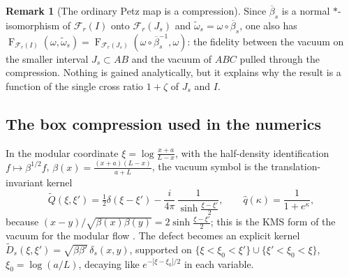 \documentclass[11pt]{article}
\theoremstyle{accent}
\theoremstyle{definition}
\newtheorem{remark}[theorem]{Remark}
\newcommand{\cF}{\mathcal{F}}
\newcommand{\Fid}{\operatorname{F}}
\begin{document}
\begin{remark}[The ordinary Petz map is a compression]
Since \(\overline\beta_s\) is a normal \(*\)-isomorphism of \(\cF_r(I)\) onto \(\cF_r(J_s)\) and \(\widetilde\omega_s=\omega\circ\overline\beta_s\), one also has
\(\Fid_{\cF_r(I)}(\omega,\widetilde\omega_s)=\Fid_{\cF_r(J_s)}(\omega\circ\overline\beta_s^{-1},\omega)\): the fidelity between the vacuum on the smaller interval \(J_s\subset AB\) and the vacuum of \(ABC\) pulled through the compression.  Nothing is gained analytically, but it explains why the result is a function of the single cross ratio \(1+\zeta\) of \(J_s\) and \(I\).
\end{remark}

\subsection{The box compression used in the numerics}\label{sec:box}

In the modular coordinate \(\xi=\log\frac{x+a}{L-x}\), with the half-density identification \(f\mapsto\beta^{1/2}f\), \(\beta(x)=\frac{(x+a)(L-x)}{a+L}\), the vacuum symbol is the translation-invariant kernel
\begin{equation}\label{eq:thermal-kernel}
 \widetilde{Q}(\xi,\xi')=\tfrac12\delta(\xi-\xi')-\frac{i}{4\pi}\,\frac{1}{\sinh\frac{\xi-\xi'}{2}},
 \qquad
 \widehat q(\kappa)=\frac1{1+e^{\kappa}},
\end{equation}
because \((x-y)/\sqrt{\beta(x)\beta(y)}=2\sinh\frac{\xi-\xi'}2\); this is the KMS form of the vacuum for the modular flow \cite{CasiniHuerta,LongoXu}.  The defect becomes an explicit kernel \(\widetilde D_s(\xi,\xi')=\sqrt{\beta\beta'}\,\delta_s(x,y)\), supported on \(\{\xi<\xi_0<\xi'\}\cup\{\xi'<\xi_0<\xi\}\), \(\xi_0=\log(a/L)\), decaying like \(e^{-|\xi-\xi_0|/2}\) in each variable.
\end{document}
